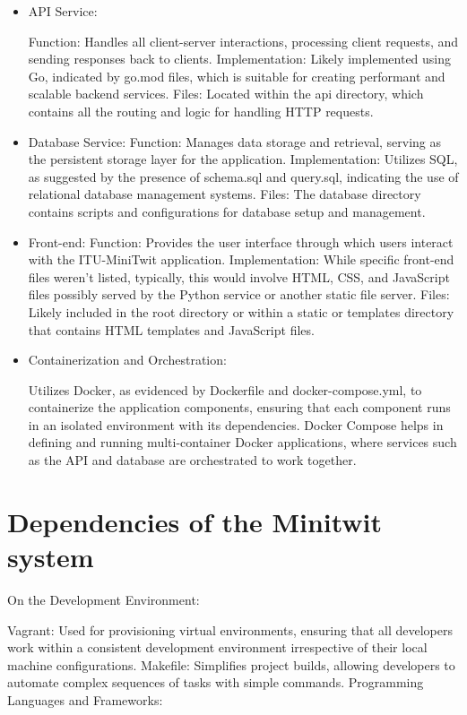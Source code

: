 \documentclass[12pt, a4paper, oneside]{book}
\begin{document}
\begin{itemize}

\item API Service:

    \subitem Function: Handles all client-server interactions, processing client requests, and sending responses back to clients.
    \subitem Implementation: Likely implemented using Go, indicated by go.mod files, which is suitable for creating performant and scalable backend services.
    \subitem Files: Located within the api directory, which contains all the routing and logic for handling HTTP requests.
\item Database Service:
    \subitem Function: Manages data storage and retrieval, serving as the persistent storage layer for the application.
    \subitem Implementation: Utilizes SQL, as suggested by the presence of schema.sql and query.sql, indicating the use of relational database management systems.
    \subitem Files: The database directory contains scripts and configurations for database setup and management.
\item Front-end:
    \subitem Function: Provides the user interface through which users interact with the ITU-MiniTwit application.
    \subitem Implementation: While specific front-end files weren't listed, typically, this would involve HTML, CSS, and JavaScript files possibly served by the Python service or another static file server.
    \subitem Files: Likely included in the root directory or within a static or templates directory that contains HTML templates and JavaScript files.
\item Containerization and Orchestration:

    \subitem Utilizes Docker, as evidenced by Dockerfile and docker-compose.yml, to containerize the application components, ensuring that each component runs in an isolated environment with its dependencies.
    \subitem Docker Compose helps in defining and running multi-container Docker applications, where services such as the API and database are orchestrated to work together.
\end{itemize}


\section{Dependencies of the Minitwit system}

On the Development Environment:

Vagrant: Used for provisioning virtual environments, ensuring that all developers work within a consistent development environment irrespective of their local machine configurations.
Makefile: Simplifies project builds, allowing developers to automate complex sequences of tasks with simple commands.
Programming Languages and Frameworks:
\end{document}
